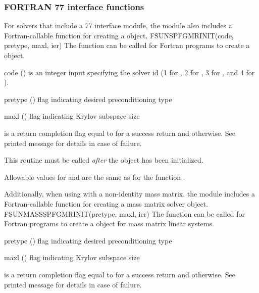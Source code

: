 \subsubsection*{FORTRAN 77 interface functions}
For solvers that include a {\F} 77 interface module, the
{\sunlinsolspfgmr} module also includes a Fortran-callable function
for creating a  object.
%
%
{
  FSUNSPFGMRINIT(code, pretype, maxl, ier)
}
{
  The function  can be called for Fortran programs
  to create a {\sunlinsolspfgmr} object.
}
{
  \begin{args}[pretype]
  \item[code] ()
    is an integer input specifying the solver id (1 for {\cvode}, 2
    for {\ida}, 3 for {\kinsol}, and 4 for {\arkode}).
  \item[pretype] ()
    flag indicating desired preconditioning type
  \item[maxl] ()
    flag indicating Krylov subspace size
  \end{args}
}
{
   is a return completion flag equal to  for a success
  return and  otherwise. See printed message for details in case
  of failure.
}
{
  This routine must be called \emph{after} the {\nvector} object has
  been initialized.

  Allowable values for  and  are the same as for
  the {\CC} function \newline {}.
}
Additionally, when using {\arkode} with a non-identity
mass matrix, the {\sunlinsolspfgmr} module includes a Fortran-callable
function for creating a  mass matrix solver
object.
%
%
{
  FSUNMASSSPFGMRINIT(pretype, maxl, ier)
}
{
  The function  can be called for Fortran programs
  to create a {\sunlinsolspfgmr} object for mass matrix linear systems.
}
{
  \begin{args}[pretype]
  \item[pretype] ()
    flag indicating desired preconditioning type
  \item[maxl] ()
    flag indicating Krylov subspace size
  \end{args}
}
{
   is a  return completion flag equal to  for a success
  return and  otherwise. See printed message for details in case
  of failure.
}
